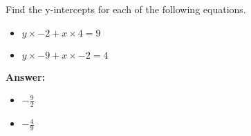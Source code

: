  Find the y-intercepts for each of the following equations. \begin{itemize}\item \( y \times -2 + x \times 4 = 9 \)\item \( y \times -9 + x \times -2 = 4 \)\end{itemize}

        \textbf{Answer:} \begin{itemize}\item \( -\frac{9}{2} \)\item \( -\frac{4}{9} \)\end{itemize}
